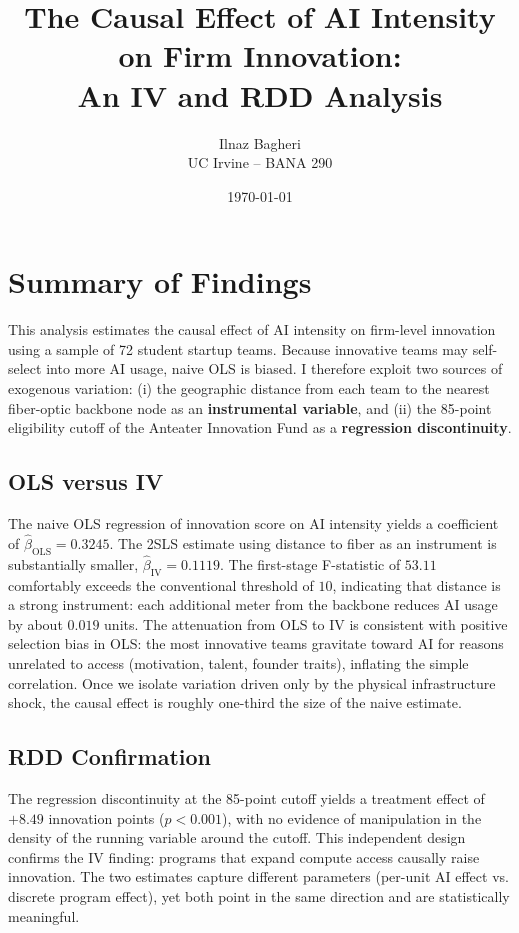 \documentclass[12pt]{article}
\title{The Causal Effect of AI Intensity on Firm Innovation: \\
       An IV and RDD Analysis}
\author{Ilnaz Bagheri \\ UC Irvine -- BANA 290}
\date{\today}
\begin{document}
\maketitle

\section*{Summary of Findings}

This analysis estimates the causal effect of AI intensity on firm-level
innovation using a sample of 72 student startup teams. Because innovative
teams may self-select into more AI usage, naive OLS is biased. I therefore
exploit two sources of exogenous variation: (i) the geographic distance
from each team to the nearest fiber-optic backbone node as an
\textbf{instrumental variable}, and (ii) the 85-point eligibility cutoff
of the Anteater Innovation Fund as a \textbf{regression discontinuity}.

\subsection*{OLS versus IV}

The naive OLS regression of innovation score on AI intensity yields a
coefficient of $\hat{\beta}_{\text{OLS}} = 0.3245$. The 2SLS estimate
using distance to fiber as an instrument is substantially smaller,
$\hat{\beta}_{\text{IV}} = 0.1119$. The first-stage F-statistic of
$53.11$ comfortably exceeds the conventional threshold of $10$,
indicating that distance is a strong instrument: each additional meter
from the backbone reduces AI usage by about $0.019$ units. The
attenuation from OLS to IV is consistent with positive selection bias in
OLS: the most innovative teams gravitate toward AI for reasons unrelated
to access (motivation, talent, founder traits), inflating the simple
correlation. Once we isolate variation driven only by the physical
infrastructure shock, the causal effect is roughly one-third the size of
the naive estimate.

\subsection*{RDD Confirmation}

The regression discontinuity at the 85-point cutoff yields a treatment
effect of $+8.49$ innovation points ($p < 0.001$), with no evidence of
manipulation in the density of the running variable around the cutoff.
This independent design confirms the IV finding: programs that expand
compute access causally raise innovation. The two estimates capture
different parameters (per-unit AI effect vs. discrete program effect),
yet both point in the same direction and are statistically meaningful.
\end{document}
